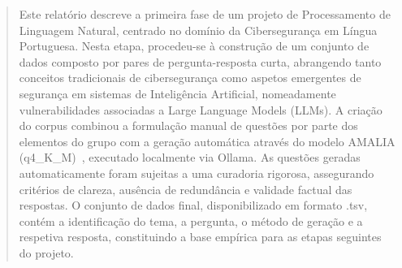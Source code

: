 \begin{abstract}
\ifmetaum
Este relatório descreve a primeira fase de um projeto de Processamento de Linguagem Natural, centrado no domínio da Cibersegurança em Língua Portuguesa. Nesta etapa, procedeu-se à construção de um conjunto de dados composto por pares de pergunta-resposta curta, abrangendo tanto conceitos tradicionais de cibersegurança como aspetos emergentes de segurança em sistemas de Inteligência Artificial, nomeadamente vulnerabilidades associadas a Large Language Models (LLMs). A criação do corpus combinou a formulação manual de questões por parte dos elementos do grupo com a geração automática através do modelo AMALIA (q4\_K\_M)~\cite{amalia_ollama}, executado localmente via Ollama. As questões geradas automaticamente foram sujeitas a uma curadoria rigorosa, assegurando critérios de clareza, ausência de redundância e validade factual das respostas. O conjunto de dados final, disponibilizado em formato .tsv, contém a identificação do tema, a pergunta, o método de geração e a respetiva resposta, constituindo a base empírica para as etapas seguintes do projeto.
\fi
\end{abstract}
